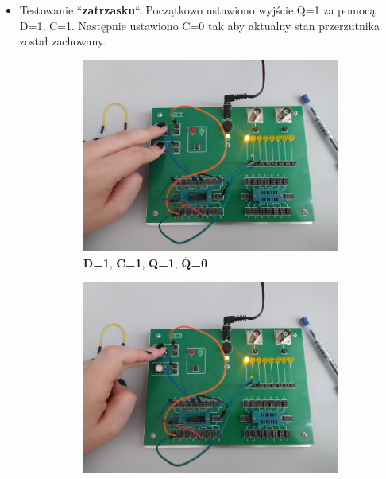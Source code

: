 \begin{itemize}
\begin{figure}[H]
\begin{subfigure}[H]{0.48\textwidth}
                \caption*{\textbf{D=1}, \textbf{C=1}, \textbf{Q=0}, $\overline{\textbf{Q}}$\textbf{=1}}
            \end{subfigure}
        \end{figure}
    \item Testowanie ``\textbf{zatrzasku}``. Początkowo ustawiono wyjście Q=1 za pomocą D=1, C=1. Następnie ustawiono C=0 tak aby aktualny stan przerzutnika został zachowany.
        \begin{figure}[H]
            \centering
            \begin{subfigure}[H]{0.48\textwidth}
                \includegraphics[width=\textwidth]{img/5_4/1653500524945_scaled.png}
                \caption*{\textbf{D=1}, \textbf{C=1}, \textbf{Q=1}, $\overline{\textbf{Q}}$\textbf{=0}}
            \end{subfigure}
            \begin{subfigure}[H]{0.48\textwidth}
                \includegraphics[width=\textwidth]{img/5_4/1653500524916_scaled.png}

\end{subfigure}
\end{figure}
\end{itemize}
